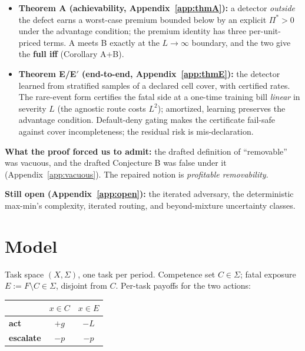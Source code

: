 \documentclass[11pt]{article}
\theoremstyle{plain}
\theoremstyle{definition}
\begin{document}
\begin{itemize}
  specialization gain cannot coexist inside the defect.
\item \textbf{Theorem A (achievability, Appendix~\ref{app:thmA}):} a detector \emph{outside} the defect earns a
  worst-case premium bounded below by an explicit $\Pi^* > 0$ under the
  advantage condition; the premium identity has three per-unit-priced terms.
  A meets B exactly at the $L \to \infty$ boundary, and the two give the
  \textbf{full iff} (Corollary A+B).
\item \textbf{Theorem E/E$'$ (end-to-end, Appendix~\ref{app:thmE}):} the detector learned from stratified
  samples of a declared cell cover, with certified rates. The rare-event form
  certifies the fatal side at a one-time training bill \emph{linear} in severity
  $L$ (the agnostic route costs $L^2$); amortized, learning preserves the
  advantage condition. Default-deny gating makes the certificate fail-safe
  against cover incompleteness; the residual risk is mis-declaration.
\end{itemize}

\textbf{What the proof forced us to admit:} the drafted definition of ``removable''
was vacuous, and the drafted Conjecture B was false under it (Appendix~\ref{app:vacuous}). The
repaired notion is \emph{profitable removability}.

\textbf{Still open (Appendix~\ref{app:open}):} the iterated adversary, the deterministic max-min's
complexity, iterated routing, and beyond-mixture uncertainty classes.

\section{Model}\label{app:model}

Task space $(X, \Sigma)$, one task per period. Competence set $C \in \Sigma$;
fatal exposure $E := F \setminus C \in \Sigma$, disjoint from $C$. Per-task
payoffs for the two actions:

\begin{center}
\begin{tabular}{lcc}
\toprule
 & $x \in C$ & $x \in E$ \\
\midrule
\textbf{act} & $+g$ & $-L$ \\
\textbf{escalate} & $-p$ & $-p$ \\
\bottomrule
\end{tabular}
\end{center}
\end{document}
